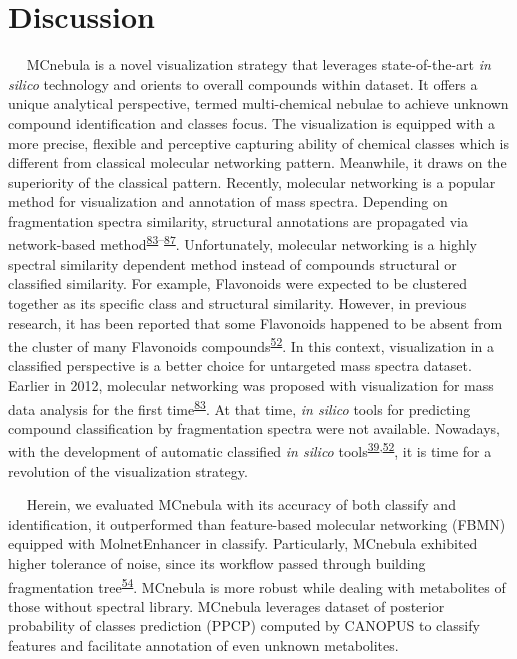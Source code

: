 \hypertarget{discussion}{%
\section{\texorpdfstring{\textbf{Discussion}}{Discussion}}\label{discussion}}

   MCnebula is a novel visualization strategy that leverages
state-of-the-art \emph{in silico} technology and orients to overall
compounds within dataset. It offers a unique analytical perspective,
termed multi-chemical nebulae to achieve unknown compound identification
and classes focus. The visualization is equipped with a more precise,
flexible and perceptive capturing ability of chemical classes which is
different from classical molecular networking pattern. Meanwhile, it
draws on the superiority of the classical pattern. Recently, molecular
networking is a popular method for visualization and annotation of mass
spectra. Depending on fragmentation spectra similarity, structural
annotations are propagated via network-based
method\textsuperscript{\protect\hyperlink{ref-2012a}{83}--\protect\hyperlink{ref-2021d}{87}}.
Unfortunately, molecular networking is a highly spectral similarity
dependent method instead of compounds structural or classified
similarity. For example, Flavonoids were expected to be clustered
together as its specific class and structural similarity. However, in
previous research, it has been reported that some Flavonoids happened to
be absent from the cluster of many Flavonoids
compounds\textsuperscript{\protect\hyperlink{ref-2021a}{52}}. In this
context, visualization in a classified perspective is a better choice
for untargeted mass spectra dataset. Earlier in 2012, molecular
networking was proposed with visualization for mass data analysis for
the first time\textsuperscript{\protect\hyperlink{ref-2012a}{83}}. At
that time, \emph{in silico} tools for predicting compound classification
by fragmentation spectra were not available. Nowadays, with the
development of automatic classified \emph{in silico}
tools\textsuperscript{\protect\hyperlink{ref-2016}{39},\protect\hyperlink{ref-2021a}{52}},
it is time for a revolution of the visualization strategy.

   Herein, we evaluated MCnebula with its accuracy of both classify and
identification, it outperformed than feature-based molecular networking
(FBMN) equipped with MolnetEnhancer in classify. Particularly, MCnebula
exhibited higher tolerance of noise, since its workflow passed through
building fragmentation
tree\textsuperscript{\protect\hyperlink{ref-2015}{54}}. MCnebula is more
robust while dealing with metabolites of those without spectral library.
MCnebula leverages dataset of posterior probability of classes
prediction (PPCP) computed by CANOPUS to classify features and
facilitate annotation of even unknown metabolites.

